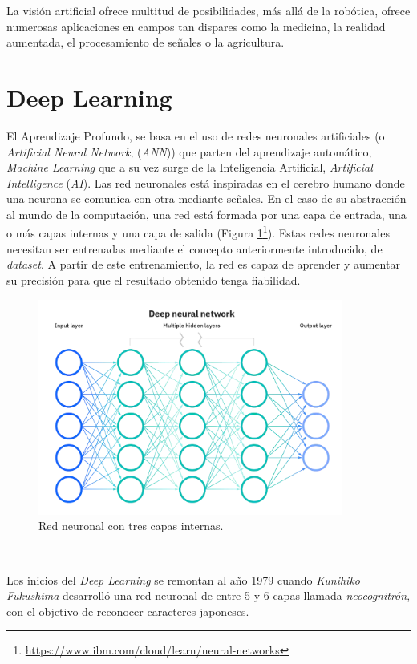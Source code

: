 La visión artificial ofrece multitud de posibilidades, más allá de la robótica, ofrece numerosas aplicaciones en campos tan dispares como la medicina, la realidad aumentada, el procesamiento de señales o la agricultura.\\

\section{Deep Learning}
\label{sec:deeplearning}
El Aprendizaje Profundo, se basa en el uso de redes neuronales artificiales (o {\textit{Artificial Neural Network}}, (\textit{ANN})) que parten del aprendizaje automático, \textit{Machine Learning} que a su vez surge de la Inteligencia Artificial, \textit{Artificial Intelligence} (\textit{AI}). Las red neuronales está inspiradas en el cerebro humano donde una neurona se comunica con otra mediante señales. En el caso de su abstracción al mundo de la computación, una red está formada por una capa de entrada, una o más capas internas y una capa de salida (Figura \ref{fig:neuralnetwork}\footnote{\url{https://www.ibm.com/cloud/learn/neural-networks}}). Estas redes neuronales necesitan ser entrenadas mediante el concepto anteriormente introducido, de \textit{dataset}. A partir de este entrenamiento, la red es capaz de aprender y aumentar su precisión para que el resultado obtenido tenga fiabilidad.\\

\begin{figure} [h!]
	\begin{center}
		\includegraphics[width=10cm]{figs/neuralnetwork}
	\end{center}
	\caption{Red neuronal con tres capas internas.}
	\label{fig:neuralnetwork}
\end{figure}\

Los inicios del \textit{Deep Learning} se remontan al año 1979 cuando \textit{Kunihiko Fukushima} desarrolló una red neuronal de entre 5 y 6 capas llamada \textit{neocognitrón}\cite{neocognitron}, con el objetivo de reconocer caracteres japoneses.\\

